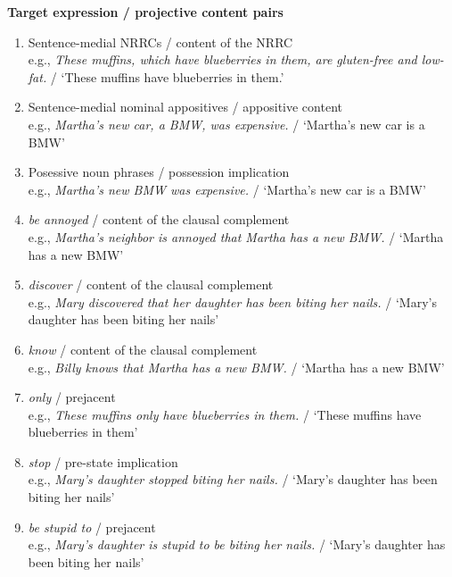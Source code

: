 \documentclass[11pt,fleqn]{article}
\newcommand{\6}{\mbox{$[\hspace*{-.6mm}[$}}
\newcommand{\9}{\mbox{$]\hspace*{-.6mm}]$}}
\begin{document}
\begin{exe}
\ex\label{pairs1a2a} {\bf Target expression / projective content pairs}

\begin{enumerate}[itemsep=-.5mm]

\item Sentence-medial NRRCs / content of the NRRC
\\ e.g., {\em These muffins, which have blueberries in them, are gluten-free and low-fat.} / `These muffins have blueberries in them.'

\item Sentence-medial nominal appositives / appositive content
\\ e.g., {\em Martha's new car, a BMW, was expensive.} / `Martha's new car is a BMW'

\item Posessive noun phrases / possession implication
\\ e.g., {\em Martha's new BMW was expensive.} / `Martha's new car is a BMW'

\item {\em be annoyed} / content of the clausal complement
\\ e.g., {\em Martha's neighbor is annoyed that Martha has a new BMW.} / `Martha has a new BMW'

\item {\em discover} / content of the clausal complement
\\ e.g., {\em Mary discovered that her daughter has been biting her nails.} / `Mary's daughter has been biting her nails'

\item {\em know} / content of the clausal complement
\\ e.g., {\em Billy knows that Martha has a new BMW.} /  `Martha has a new BMW'

\item {\em only} / prejacent
\\ e.g., {\em These muffins only have blueberries in them.} / `These muffins have blueberries in them'

\item {\em stop} / pre-state implication
\\ e.g., {\em Mary's daughter stopped biting her nails.}  / `Mary's daughter has been biting her nails'

\item {\em be stupid to} / prejacent
\\ e.g., {\em Mary's daughter is stupid to be biting her nails.} / `Mary's daughter has been biting her nails'

\end{enumerate}
\end{exe}
\end{document}
